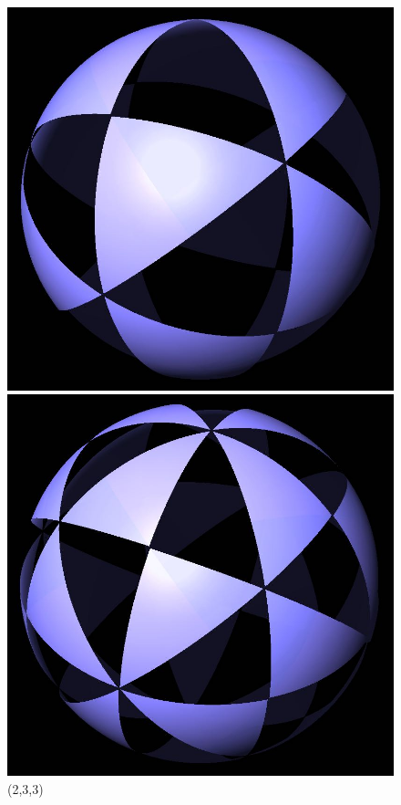 \documentclass{article}
\begin{document}
\begin{figure}[ht]
    \centering
    \begin{minipage}{0.2\linewidth}
        \includegraphics[width=0.9\linewidth]{（2，3，3）.jpg}
        \caption{(2,3,3)}
        \label{fig:subim9}
    \end{minipage}
    \begin{minipage}{0.2\linewidth}
        \includegraphics[width=0.9\linewidth]{（2，3，4）.jpg}

\end{minipage}
\end{figure}
\end{document}
